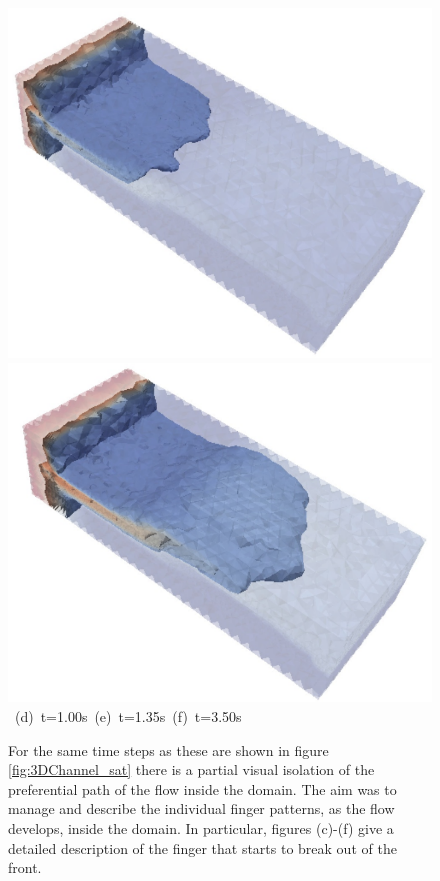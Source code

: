 \begin{landscape}
\begin{figure}[ht]
{{            \includegraphics[width=.45\textwidth]{./Pics1/3D_Channel/3D_Channel_Saturation1Isosurface_D150c.pdf}
            \includegraphics[width=.45\textwidth]{./Pics1/3D_Channel/3D_Channel_Saturation1Isosurface_D400c.pdf} }
      \hbox{\hspace{3.cm} (d) t=1.00s \hspace{3.cm} (e) t=1.35s\hspace{4.cm} (f) t=3.50s }}
\caption{For the same time steps as these are shown in figure \ref{fig:3DChannel_sat} there is a partial visual isolation of the preferential path of the flow inside the domain. The aim was to manage and describe the individual finger patterns, as the flow develops, inside the domain. In particular, figures (c)-(f) give a detailed description of the finger that starts to break out of the front.}
\label{fig:3DChannel_Isosurf}
\end{figure}
\end{landscape}
\clearpage



